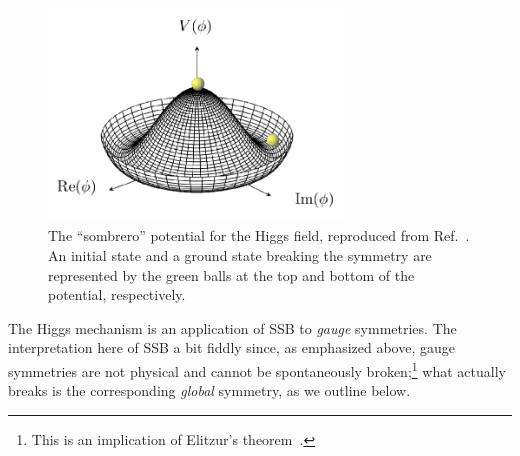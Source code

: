 \begin{figure}[ht!]
	\centering
	\includegraphics[width=0.7\textwidth]{figures/01-SM-02-QFT/sombrero_potential.png}
	\caption{The ``sombrero'' potential for the Higgs field, reproduced from Ref.~\cite{Duff:2020wmn}.
	An initial state and a ground state breaking the \UU[1] symmetry are represented by the green balls at the top and bottom of the potential, respectively.}
	\label{fig:01_qft_higgs_potential}
\end{figure}

The Higgs mechanism is an application of SSB to \textit{gauge} symmetries.
The interpretation here of SSB a bit fiddly since, as emphasized above, gauge symmetries are not physical and cannot be spontaneously broken;\footnote{This is an implication of Elitzur's theorem~\cite{Elitzur:1975im}.} what actually breaks is the corresponding \textit{global} symmetry, as we outline below.

